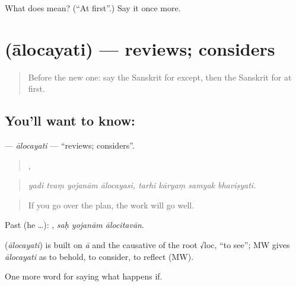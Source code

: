 \begin{tcolorbox}[breakable,colback=teal!4,colframe=teal!35!black,title={Before you move on}]
What does  mean? (\textquotedblleft{}At first\textquotedblright{}.) Say it once more.
\end{tcolorbox}
\section[\texorpdfstring{\sk{आलोचयति} (ālocayati)}{आलोचयति (ālocayati)}]{ (ālocayati) — reviews; considers}

\label{lesson:SA-C545-alocayati}



\begin{quote}
Before the new one: say the Sanskrit for except, then the Sanskrit for at first.
\end{quote}

\subsection*{You'll want to know: }
\textbf{} — \emph{ālocayati} — \textquotedblleft{}reviews; considers\textquotedblright{}.

\begin{quote}
   ,    
\end{quote}

\begin{quote}
\emph{yadi tvaṃ yojanām ālocayasi, tarhi kāryaṃ samyak bhaviṣyati.}
\end{quote}

\begin{quote}
If you go over the plan, the work will go well.
\end{quote}

Past (he …):   , \emph{saḥ yojanām ālocitavān}.

\begin{cousinweb}
\textbf{} (\emph{ālocayati}) is built on \emph{ā} and the causative of the root √loc, \textquotedblleft{}to see\textquotedblright{}; MW gives \emph{ālocayati} as to behold, to consider, to reflect (MW).
\end{cousinweb}

\begin{grammarlens}[title={What you've built}]
One more word for saying what happens if.
\end{grammarlens}


